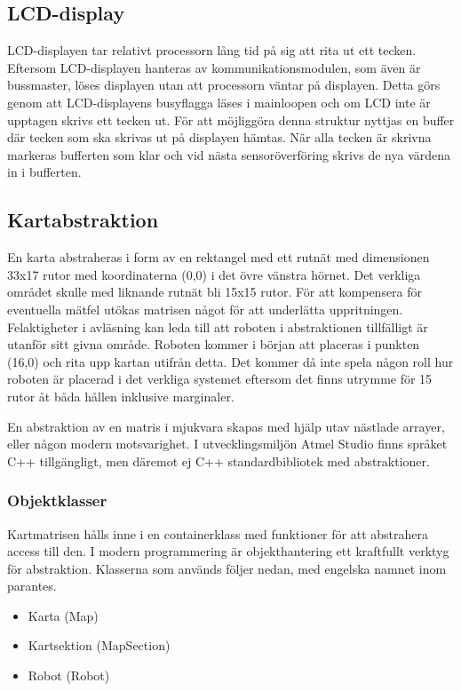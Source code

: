 ﻿\documentclass[a4paper,12pt,fleqn]{article}
\begin{document}
\subsection{LCD-display}
LCD-displayen tar relativt processorn lång tid på sig att rita ut ett tecken. Eftersom LCD-displayen hanteras av kommunikationsmodulen, som även är bussmaster, löses displayen utan att processorn väntar på displayen. Detta görs genom att LCD-displayens busyflagga läses i mainloopen och om LCD inte är upptagen skrivs ett tecken ut. För att möjliggöra denna struktur nyttjas en buffer där tecken som ska skrivas ut på displayen hämtas. När alla tecken är skrivna markeras bufferten som klar och vid nästa sensoröverföring skrivs de nya värdena in i bufferten. 

\subsection{Kartabstraktion}

En karta abstraheras i form av en rektangel med ett rutnät med dimensionen 33x17 rutor med koordinaterna (0,0) i det övre vänstra hörnet. Det verkliga området skulle med liknande rutnät bli 15x15 rutor. För att kompensera för eventuella mätfel utökas matrisen något för att underlätta uppritningen. Felaktigheter i avläsning kan leda till att roboten i abstraktionen tillfälligt är utanför sitt givna område. Roboten kommer i början att placeras i punkten (16,0) och rita upp kartan utifrån detta. Det kommer då inte spela någon roll hur roboten är placerad i det verkliga systemet eftersom det finns utrymme för 15 rutor åt båda hållen inklusive marginaler. 

En abstraktion av en matris i mjukvara skapas med hjälp utav nästlade arrayer, eller någon modern motsvarighet. I utvecklingsmiljön Atmel Studio finns språket C++ tillgängligt, men däremot ej C++ standardbibliotek med abstraktioner.

\subsubsection{Objektklasser}

Kartmatrisen hålls inne i en containerklass med funktioner för att abstrahera access till den. I modern programmering är objekthantering ett kraftfullt verktyg för abstraktion. Klasserna som används följer nedan, med engelska namnet inom parantes.

\begin{itemize}
	\item Karta (Map)
	\item Kartsektion (MapSection)
	\item Robot (Robot)
\end{itemize}
\end{document}
